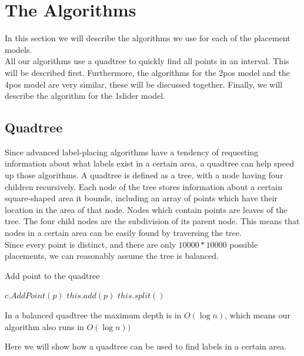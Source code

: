 \documentclass[crop=false,a4paper,oneside,11pt]{article}
\begin{document}
\section{The Algorithms}
In this section we will describe the algorithms we use for each of the placement models.\\
All our algorithms use a quadtree to quickly find all points in an interval. This will be described first. Furthermore, the algorithms for the 2pos model and the 4pos model are very similar, these will be discussed together. Finally, we will describe the algorithm for the 1slider model.

\subsection{Quadtree}

Since advanced label-placing algorithms have a tendency of requesting information about what labels exist in a certain area, a quadtree can help speed up those algorithms. A quadtree is defined as a tree, with a node having four children recursively. Each node of the tree stores information about a certain square-shaped area it bounds, including an array of points which have their location in the area of that node. Nodes which contain points are leaves of the tree. The four child nodes are the subdivision of its parent node. This means that nodes in a certain area can be easily found by traversing the tree.\\
Since every point is distinct, and there are only $10000 * 10000$ possible placements, we can reasonably assume the tree is balanced.\\
\begin{algorithm}[H]
\caption{Add point to the quadtree}
\begin{algorithmic}[1]
\State $c.AddPoint(p)$
\EndIf
\EndFor
\Else{}
\State $this.add(p)$
\State $this.split()$ 
\EndIf
\EndIf
\EndProcedure
\end{algorithmic}
\end{algorithm}
In a balanced quadtree the maximum depth is in $O(\log{n})$, which means our algorithm also runs in $O(\log{n}))$

Here we will show how a quadtree can be used to find labels in a certain area.\\
\end{document}
